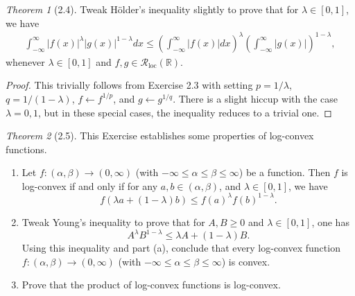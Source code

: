 \documentclass[12pt]{article}
\theoremstyle{remark}
\theoremstyle{named}
\newtheorem*{theorem}{Theorem}
\renewcommand{\a}{\alpha}
\renewcommand{\b}{\beta}
\newcommand{\R}{\mathbb R}
\newcommand{\Rloc}{\mathcal R_{\text{loc}}}
\newcommand{\infint}{\int_{-\infty}^{\infty}}
\begin{document}
\begin{theorem}[2.4]
    Tweak H\"older's inequality slightly to prove that for \(\lambda \in [0, 1]\), we have 
    \begin{align*}
        \infint |f(x)|^\lambda |g(x)|^{1 - \lambda} dx \leq \left(\infint |f(x)| dx\right)^\lambda \left(\infint |g(x)|\right)^{1 - \lambda},
    \end{align*}
    whenever \(\lambda \in [0, 1]\) and \(f, g \in \Rloc(\R)\).
\end{theorem}

\begin{proof}
    This trivially follows from Exercise 2.3 with setting \(p = 1/\lambda\), \(q = 1 / (1 - \lambda)\), \(f \leftarrow f^{1/p}\), and \(g \leftarrow g^{1/q}\). There is a slight hiccup with the case \(\lambda = 0, 1\), but in these special cases, the inequality reduces to a trivial one.
\end{proof}

\begin{theorem}[2.5]
    This Exercise establishes some properties of log-convex functions.
    \begin{enumerate}
        \item Let \(f : (\a, \b) \to (0, \infty)\) (with \(-\infty \leq \a \leq \b \leq \infty\)) be a function. Then \(f\) is log-convex if and only if for any \(a, b \in (\a, \b)\), and \(\lambda \in [0, 1]\), we have
        \[f(\lambda a + (1 - \lambda) b) \leq f(a)^\lambda f(b)^{1 - \lambda}.\]
        \item Tweak Young's inequality to prove that for \(A, B \geq 0\) and \(\lambda \in [0, 1]\), one has 
        \[A^\lambda B^{1 - \lambda} \leq \lambda A + (1 - \lambda) B.\]
        Using this inequality and part (a), conclude that every log-convex function \(f : (\a, \b) \to (0, \infty)\) (with \(-\infty \leq \a \leq \b \leq \infty\)) is convex.
        \item Prove that the product of log-convex functions is log-convex.
    \end{enumerate}
\end{theorem}
\end{document}
